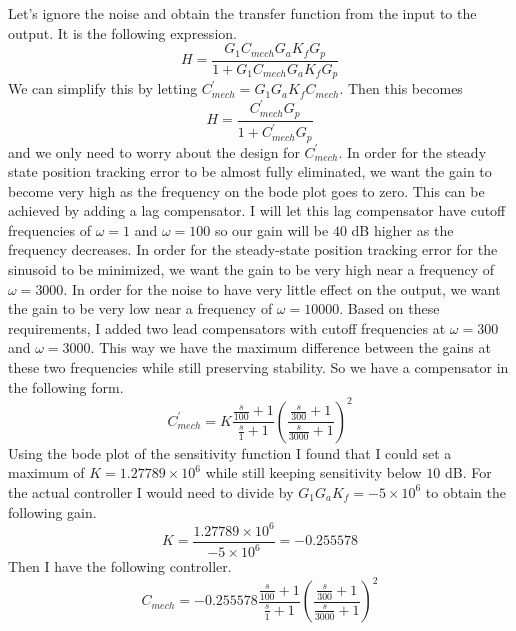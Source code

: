 \documentclass[12pt]{article}
\begin{document}
Let's ignore the noise and obtain the transfer function from the input to the output. It is the following expression.
\[H = \frac{G_1C_{mech}G_aK_fG_p}{1+G_1C_{mech}G_aK_fG_p}\]
We can simplify this by letting \(C^\prime_{mech}=G_1G_aK_fC_{mech}\). Then this becomes
\[H = \frac{C^\prime_{mech}G_p}{1+C^\prime_{mech}G_p}\]
and we only need to worry about the design for \(C^\prime_{mech}\). In order for the steady state position
tracking error to be almost fully eliminated, we want the gain to become very high as the frequency on the bode plot
goes to zero. This can be achieved by adding a lag compensator. I will let this lag compensator have cutoff frequencies
of \(\omega=1\) and \(\omega=100\) so our gain will be \(40\) dB higher as the frequency decreases.
In order for the steady-state position tracking error for the sinusoid to be minimized, we want the gain to be very
high near a frequency of \(\omega=3000\). In order for the noise to have very little effect on the output, we want the gain
to be very low near a frequency of \(\omega=10000\). Based on these requirements, I added two lead compensators with
cutoff frequencies at \(\omega=300\) and \(\omega=3000\). This way we have the maximum difference between the gains at these
two frequencies while still preserving stability. So we have a compensator in the following form.
\[C^\prime_{mech}=K\frac{\frac{s}{100}+1}{\frac{s}{1}+1}\left(\frac{\frac{s}{300}+1}{\frac{s}{3000}+1}\right)^2\]
Using the bode plot of the sensitivity function I found that I could set a maximum of \(K=1.27789\times 10^6\) while still
keeping sensitivity below \(10\) dB. For the actual controller I would need to divide by \(G_1G_aK_f=-5\times 10^6\) to
obtain the following gain.
\[K=\frac{1.27789\times10^6}{-5\times 10^6}=-0.255578\]
Then I have the following controller.
\[C_{mech}=-0.255578\frac{\frac{s}{100}+1}{\frac{s}{1}+1}\left(\frac{\frac{s}{300}+1}{\frac{s}{3000}+1}\right)^2\]
\end{document}
